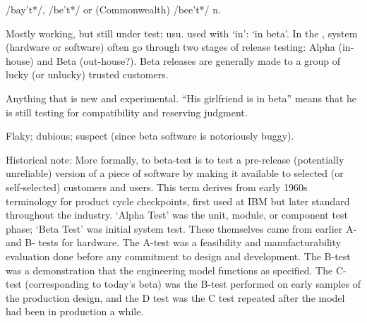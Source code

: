  /bay't*/, /be't*/ or (Commonwealth) /bee't*/ n.

\begin{inparaenum}
    \item Mostly working, but still under test; usu. used with `in': `in beta'.
        In the , system (hardware or software) often go
        through two stages of release testing: Alpha (in-house) and Beta
        (out-house?). Beta releases are generally made to a group of lucky (or
        unlucky) trusted customers.
    \item Anything that is new and experimental. ``His girlfriend is in beta''
        means that he is still testing for compatibility and reserving judgment.
    \item Flaky; dubious; suspect (since beta software is notoriously buggy).
\end{inparaenum}

Historical note: More formally, to beta-test is to test a pre-release
(potentially unreliable) version of a piece of software by making it available
to selected (or self-selected) customers and users. This term derives from early
1960s terminology for product cycle checkpoints, first used at IBM but later
standard throughout the industry. `Alpha Test' was the unit, module, or
component test phase; `Beta Test' was initial system test. These themselves came
from earlier A- and B- tests for hardware. The A-test was a feasibility and
manufacturability evaluation done before any commitment to design and
development. The B-test was a demonstration that the engineering model functions
as specified. The C-test (corresponding to today's beta) was the B-test
performed on early samples of the production design, and the D test was the C
test repeated after the model had been in production a while.

